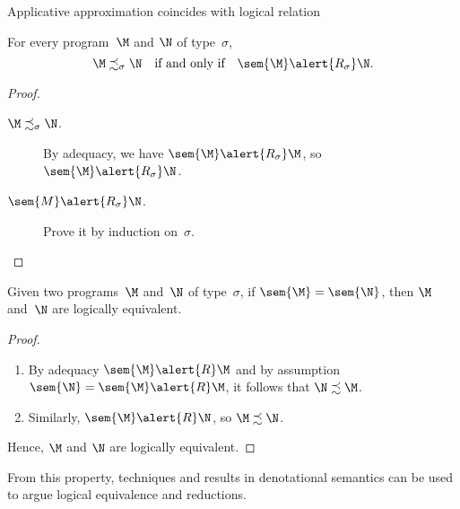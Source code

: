 \begin{frame}{Applicative approximation coincides with logical relation}
  \begin{lemma}
    For every program~$\M$ and $\N$ of type~$\sigma$,
    \[
      \M \precsim_\sigma \N
      \quad\text{if and only if}\quad
      \sem{\M} \alert{\mathrel{R_\sigma}} \N.
    \]
  \end{lemma}
  \begin{proof}
    \begin{description}
      \item[$\M \precsim_\sigma \N$.] By adequacy, we have
        $\sem{\M} \alert{\mathrel{R_\sigma}} \M$, so $\sem{\M}
        \alert{\mathrel{R_\sigma}} \N$. 
      \item[$\sem{M}\alert{\mathrel{R_\sigma}} \N$.]
        Prove it by induction on~$\sigma$.
    \end{description}
  \end{proof}
\end{frame}

\begin{frame}
  \begin{corollary}
    Given two programs~$\M$ and~$\N$ of type~$\sigma$, 
    if $\sem{\M} = \sem{\N}$, then $\M$ and~$\N$ are logically equivalent. 
  \end{corollary}
  \begin{proof}
    \begin{enumerate}
      \item By adequacy $\sem{\M} \alert{\mathrel{R}} \M$ and by assumption
        $\sem{\N} = \sem{\M} \alert{\mathrel{R}} \M$, it follows that $\N
        \precsim \M$.  \item Similarly, 
        $\sem{\M} \alert{\mathrel{R}} \N$, so $\M \precsim \N$. 
    \end{enumerate}
    Hence, $\M$ and $\N$ are logically equivalent.
  \end{proof}
  From this property, techniques and results in denotational semantics can be
  used to argue logical equivalence and reductions. 
\end{frame}

